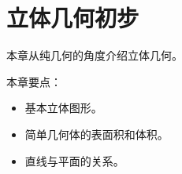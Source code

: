 \chapter{立体几何初步}

本章从纯几何的角度介绍立体几何。

本章要点：
\begin{itemize}
    \item 基本立体图形。
    \item 简单几何体的表面积和体积。
    \item 直线与平面的关系。
\end{itemize}

\newpage


\newpage


\newpage


\newpage


\newpage


\newpage


\newpage





